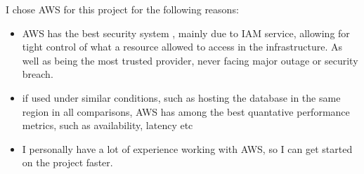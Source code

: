 I chose AWS for this project for the following reasons:
\begin{itemize}
    \item{AWS has the best security system \cite{Narula2015Cloud}, mainly due to IAM service, allowing for tight control of what a resource allowed to access in the infrastructure. As well as being the most trusted provider, never facing major outage or security breach. }
    \item{if used under similar conditions, such as hosting the database in the same region in all comparisons, AWS has among the best quantative performance metrics, such as availability, latency etc \cite{CloudMetrics}  }
    \item {I personally have a lot of experience working with AWS, so I can get started on the project faster.}
\end{itemize}
